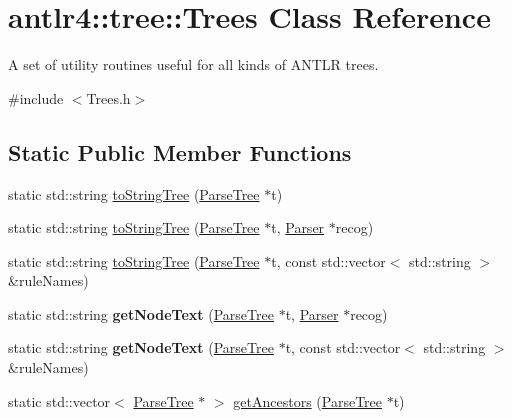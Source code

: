 \hypertarget{classantlr4_1_1tree_1_1Trees}{}\section{antlr4\+:\+:tree\+:\+:Trees Class Reference}
\label{classantlr4_1_1tree_1_1Trees}


A set of utility routines useful for all kinds of A\+N\+T\+LR trees.  




{\ttfamily \#include $<$Trees.\+h$>$}

\subsection*{Static Public Member Functions}
\begin{DoxyCompactItemize}
\item 
static std\+::string \hyperlink{classantlr4_1_1tree_1_1Trees_af42d30a3549e9eb77ee0cda86f108a99}{to\+String\+Tree} (\hyperlink{classantlr4_1_1tree_1_1ParseTree}{Parse\+Tree} $\ast$t)
\item 
static std\+::string \hyperlink{classantlr4_1_1tree_1_1Trees_a2b10e649c452d5532ed5d7f5df354b0a}{to\+String\+Tree} (\hyperlink{classantlr4_1_1tree_1_1ParseTree}{Parse\+Tree} $\ast$t, \hyperlink{classantlr4_1_1Parser}{Parser} $\ast$recog)
\item 
static std\+::string \hyperlink{classantlr4_1_1tree_1_1Trees_ac3db7b91357b48843aeafe6df44df0ac}{to\+String\+Tree} (\hyperlink{classantlr4_1_1tree_1_1ParseTree}{Parse\+Tree} $\ast$t, const std\+::vector$<$ std\+::string $>$ \&rule\+Names)
\item 
\mbox{\label{classantlr4_1_1tree_1_1Trees_a194c79806c6d475d702f1415ea050fae}} 
static std\+::string {\bfseries get\+Node\+Text} (\hyperlink{classantlr4_1_1tree_1_1ParseTree}{Parse\+Tree} $\ast$t, \hyperlink{classantlr4_1_1Parser}{Parser} $\ast$recog)
\item 
\mbox{\label{classantlr4_1_1tree_1_1Trees_ae0417fc83a42ca012ac9c250d93505b1}} 
static std\+::string {\bfseries get\+Node\+Text} (\hyperlink{classantlr4_1_1tree_1_1ParseTree}{Parse\+Tree} $\ast$t, const std\+::vector$<$ std\+::string $>$ \&rule\+Names)
\item 
static std\+::vector$<$ \hyperlink{classantlr4_1_1tree_1_1ParseTree}{Parse\+Tree} $\ast$ $>$ \hyperlink{classantlr4_1_1tree_1_1Trees_a39347710dea5497ad28988b6ce61fc07}{get\+Ancestors} (\hyperlink{classantlr4_1_1tree_1_1ParseTree}{Parse\+Tree} $\ast$t)

\end{DoxyCompactItemize}

